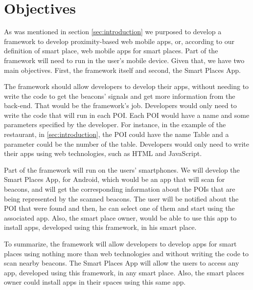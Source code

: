 
% 
% 

\section{Objectives}
\label{sec:objectives}

As was mentioned in section \ref{sec:introduction} we purposed
to develop a framework to develop proximity-based web mobile
apps, or, according to our definition of smart place, web
mobile apps for smart places.
Part of the framework will need to run in the user's 
mobile device.
Given that, we have two main objectives. First, the framework
itself and second, the Smart Places App.

The framework should allow developers to develop their apps,
without needing to write the code to get the beacons' signals
and get more information from the back-end. That would be the
framework's job. Developers would only need to write the code
that will run in each POI. Each POI would have a name and
some parameters specified by the developer. 
For instance, in the example of the restaurant,
in \ref{sec:introduction}, the POI could have the name Table and
a parameter could be the number of the table.
Developers would only need to write their apps using web
technologies, such as HTML and JavaScript.

Part of the framework will run on the users' smartphones.
We will develop the Smart Places App, for Android, which would
be an  app that will scan for beacons, and will get the 
corresponding information about the POIs that are being 
represented by the scanned beacons.
The user will be notified about the POI
that were found and then, he can select one of them and
start using the associated app. 
Also, the smart place owner, would be able to use this app
to install apps, developed using this framework, in his
smart place.

To summarize, the framework will allow developers to develop
apps for smart places using nothing more than web technologies
and without writing the code to scan nearby beacons.
The Smart Places App will allow the users to access any app,
developed using this framework, in any smart place. Also,
the smart places owner could install apps in their spaces
using this same app.
